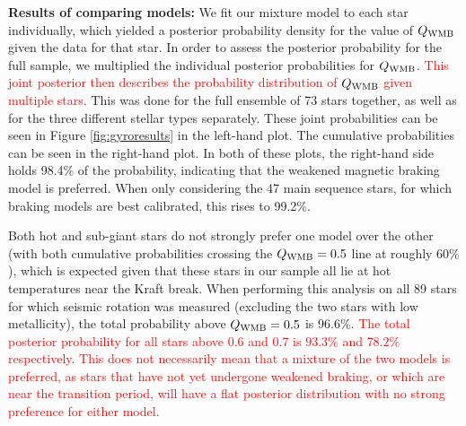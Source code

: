 \documentclass[12pt]{article}
\newcommand{\rtwo}[1]{\textcolor{red}{{#1}}}
\begin{document}
\textbf{Results of comparing models:} We fit our mixture model to each star individually, which yielded a posterior probability density for the value of $Q_{\rm WMB}$ given the data for that star. In order to assess the posterior probability for the full sample, we multiplied the individual posterior probabilities for $Q_{\rm{WMB}}$. \rtwo{This joint posterior then describes the probability distribution of $Q_{\rm WMB}$ given multiple stars.} This was done for the full ensemble of 73 stars together, as well as for the three different stellar types separately. These joint probabilities can be seen in Figure \ref{fig:gyroresults} in the left-hand plot. The cumulative probabilities can be seen in the right-hand plot. In both of these plots, the right-hand side holds 98.4\% of the probability, indicating that the weakened magnetic braking model is preferred. When only considering the 47 main sequence stars, for which braking models are best calibrated, this rises to 99.2\%. 

Both hot and sub-giant stars do not strongly prefer one model over the other (with both cumulative probabilities crossing the $Q_{\rm{WMB}} = 0.5$ line at roughly $60\%$), which is expected given that these stars in our sample all lie at hot temperatures near the Kraft break. When performing this analysis on all 89 stars for which seismic rotation was measured (excluding the two stars with low metallicity), the total probability above $Q_{\rm{WMB}} = 0.5$ is 96.6\%. \rtwo{The total posterior probability for all stars above $0.6$ and $0.7$ is $93.3\%$ and $78.2\%$  respectively. This does not necessarily mean that a mixture of the two models is preferred, as stars that have not yet undergone weakened braking, or which are near the transition period, will have a flat posterior distribution with no strong preference for either model.}\\
\end{document}
